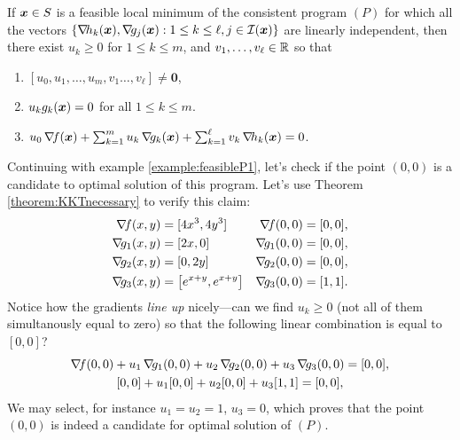 \begin{theorem}\label{theorem:KKTnecessary}
If $\boldsymbol{x} \in S$ is a feasible local minimum of the consistent program $(P)$ for which all the vectors $\{ \mathop{\nabla\! {h_k}}(\boldsymbol{x}), \mathop{\nabla\! {g_j}}(\boldsymbol{x}) : 1 \leq k \leq \ell, j \in \mathcal{I}(\boldsymbol{x}) \}$ are linearly independent, then there exist $u_k \geq 0$ for $1\leq k \leq m$, and $v_1, \dots, v_\ell \in \mathbb{R}$ so that
\begin{enumerate}
 	\item $[u_0, u_1, \dotsc, u_m, v_1 \dotsc, v_\ell ] \neq \boldsymbol{0}$,
 	\item $u_k g_k(\boldsymbol{x}) = 0$ for all $1 \leq k \leq m$.
 	\item $u_0 \mathop{\nabla\! {f}}(\boldsymbol{x}) + \sum_{k=1}^m u_k \mathop{\nabla\! {g_k}}(\boldsymbol{x}) + \sum_{k=1}^\ell v_k \mathop{\nabla\! {h_k}}(\boldsymbol{x}) = 0$.
 \end{enumerate}
\end{theorem}

\begin{example}
Continuing with example \ref{example:feasibleP1}, let's check if the point $(0,0)$ is a candidate to optimal solution of this program.  Let's use Theorem \ref{theorem:KKTnecessary} to verify this claim:
\begin{align*}
\gradient{f}(x,y) &= [ 4x^3, 4y^3 ] &\gradient{f}(0,0) &= [0,0], \\
\gradient{g_1}(x,y) &= [ 2x, 0 ] &\gradient{g_1}(0,0) &= [0,0], \\
\gradient{g_2}(x,y) &= [0, 2y] &\gradient{g_2}(0,0) &= [0,0], \\
\gradient{g_3}(x,y) &= \big[e^{x+y}, e^{x+y} \big] &\gradient{g_3}(0,0) &= [1,1].
\end{align*}
Notice how the gradients \emph{line up} nicely---can we find $u_k \geq 0$ (not all of them simultanously equal to zero) so that the following linear combination is equal to $[0,0]$?
\begin{gather*}
\mathop{\nabla\! {f}}(0,0) + u_1 \mathop{\nabla\! {g_1}}(0,0) + u_2 \mathop{\nabla\! {g_2}}(0,0) + u_3 \mathop{\nabla\! {g_3}}(0,0) = [0,0], \\
[0,0] + u_1[0,0] + u_2[0,0] +u_3[1,1] = [0,0],
\end{gather*}
We may select, for instance $u_1=u_2=1$, $u_3=0$, which proves that the point $(0,0)$ is indeed a candidate for optimal solution of $(P)$.
\end{example}


